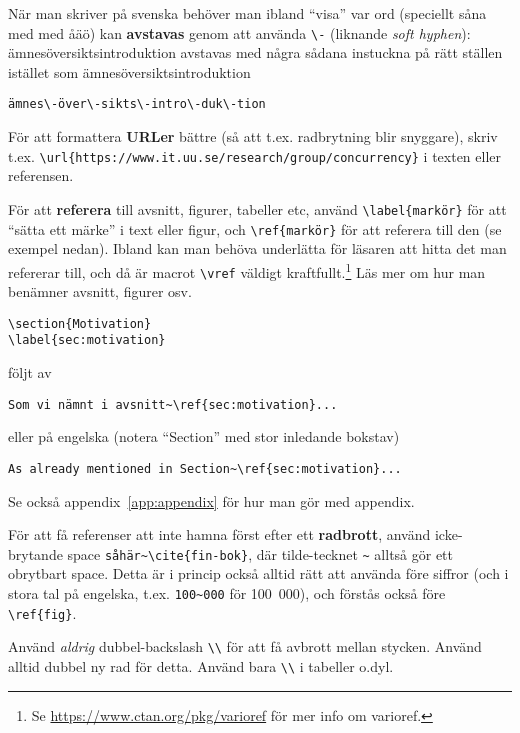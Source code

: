 När man skriver på svenska behöver man ibland ``visa'' var ord (speciellt såna med med åäö) kan \textbf{avstavas} genom att använda \verb|\-| (liknande \textit{soft hyphen}): ämnesöversiktsintroduktion avstavas med några sådana instuckna på rätt ställen istället som ämnes\-över\-sikts\-intro\-duk\-tion

\begin{verbatim}
ämnes\-över\-sikts\-intro\-duk\-tion
\end{verbatim}

För att formattera \textbf{URLer} bättre (så att t.ex. radbrytning blir snyggare), skriv t.ex. \verb|\url{https://www.it.uu.se/research/group/concurrency}| i texten eller referensen.

\label{sec:referera-labels}
För att \textbf{referera} till avsnitt, figurer, tabeller etc, använd \verb|\label{markör}| för att ``sätta ett märke'' i text eller figur, och \verb|\ref{markör}| för att referera till den (se exempel nedan).  Ibland kan man behöva underlätta för läsaren att hitta det man refererar till, och då är macrot \verb|\vref| väldigt kraftfullt.\footnote{Se \url{https://www.ctan.org/pkg/varioref} för mer info om varioref.}
Läs mer  om hur man benämner avsnitt, figurer osv.
\begin{verbatim}
\section{Motivation}
\label{sec:motivation}
\end{verbatim}

följt av
\begin{verbatim}
Som vi nämnt i avsnitt~\ref{sec:motivation}...
\end{verbatim}
eller på engelska (notera ``Section'' med stor inledande bokstav)
\begin{verbatim}
As already mentioned in Section~\ref{sec:motivation}...
\end{verbatim}
Se också appendix~\vref{app:appendix} för hur man gör med appendix.


För att få referenser att inte hamna först efter ett \textbf{radbrott}, använd icke-brytande space \verb|såhär~\cite{fin-bok}|, där tilde-tecknet \verb|~| alltså gör ett obrytbart space. Detta är i princip också alltid rätt att använda före siffror (och i stora tal på engelska, t.ex. \verb|100~000| för 100~000), och förstås också före \verb|\ref{fig}|.

Använd \emph{aldrig} dubbel-backslash \verb|\\| för att få avbrott mellan stycken. Använd alltid dubbel ny rad för detta. Använd bara \verb|\\| i tabeller o.dyl.

